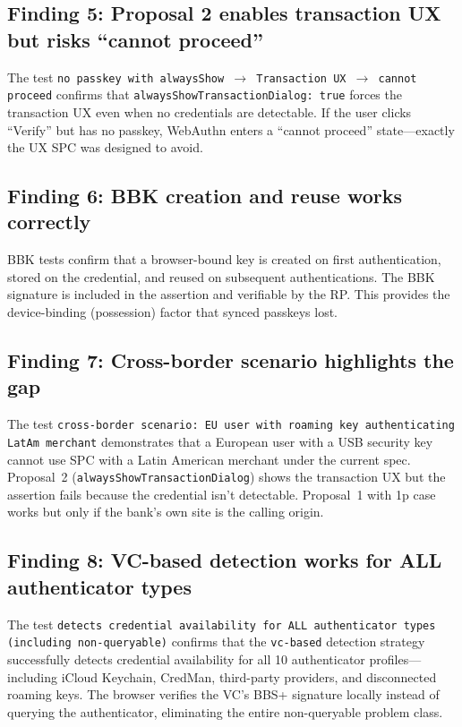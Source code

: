 \documentclass[12pt,a4paper]{article}
\begin{document}
\subsection{Finding 5: Proposal 2 enables transaction UX but risks ``cannot proceed''}

The test \texttt{no passkey with alwaysShow $\to$ Transaction UX $\to$ cannot proceed} confirms that \texttt{alwaysShowTransactionDialog: true} forces the transaction UX even when no credentials are detectable. If the user clicks ``Verify'' but has no passkey, WebAuthn enters a ``cannot proceed'' state---exactly the UX SPC was designed to avoid.

\subsection{Finding 6: BBK creation and reuse works correctly}

BBK tests confirm that a browser-bound key is created on first authentication, stored on the credential, and reused on subsequent authentications. The BBK signature is included in the assertion and verifiable by the RP. This provides the device-binding (possession) factor that synced passkeys lost.

\subsection{Finding 7: Cross-border scenario highlights the gap}

The test \texttt{cross-border scenario: EU user with roaming key authenticating LatAm merchant} demonstrates that a European user with a USB security key cannot use SPC with a Latin American merchant under the current spec. Proposal~2 (\texttt{alwaysShowTransactionDialog}) shows the transaction UX but the assertion fails because the credential isn't detectable. Proposal~1 with 1p case works but only if the bank's own site is the calling origin.

\subsection{Finding 8: VC-based detection works for ALL authenticator types}

The test \texttt{detects credential availability for ALL authenticator types (including non-queryable)} confirms that the \texttt{vc-based} detection strategy successfully detects credential availability for all 10 authenticator profiles---including iCloud Keychain, CredMan, third-party providers, and disconnected roaming keys. The browser verifies the VC's BBS+ signature locally instead of querying the authenticator, eliminating the entire non-queryable problem class.
\end{document}
